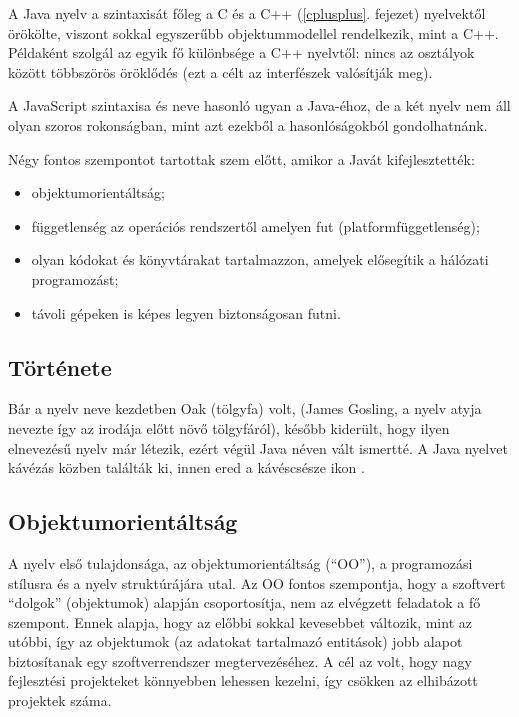 \documentclass[a4paper,12pt]{report}
\begin{document}
\vspace{2mm}
A Java nyelv a szintaxisát főleg a C és a C++ (\ref{cplusplus}. fejezet) nyelvektől örökölte, viszont sokkal egyszerűbb objektummodellel rendelkezik, mint a C++. Példaként szolgál az egyik fő különbsége a C++ nyelvtől: nincs az osztályok között többszörös öröklődés (ezt a célt az interfészek valósítják meg). 

\vspace{2mm}
A JavaScript szintaxisa és neve hasonló ugyan a Java-éhoz, de a két nyelv nem áll olyan szoros rokonságban, mint azt ezekből a hasonlóságokból gondolhatnánk.

\vspace{2mm}
Négy fontos szempontot tartottak szem előtt, amikor a Javát kifejlesztették:
\begin{itemize}
\item objektumorientáltság;
\item függetlenség az operációs rendszertől amelyen fut (platformfüggetlenség);
\item olyan kódokat és könyvtárakat tartalmazzon, amelyek elősegítik a hálózati programozást;
\item távoli gépeken is képes legyen biztonságosan futni.
\end{itemize}

\subsection{Története}
\label{javahistory}
\vspace{2mm}
Bár a nyelv neve kezdetben Oak (tölgyfa) volt, (James Gosling, a nyelv atyja nevezte így az irodája előtt növő tölgyfáról), később kiderült, hogy ilyen elnevezésű nyelv már létezik, ezért végül Java néven vált ismertté. A Java nyelvet kávézás közben találták ki, innen ered a kávéscsésze ikon \cite{javaname}.

\subsection{Objektumorientáltság}
\label{oo}

A nyelv első tulajdonsága, az objektumorientáltság (``OO''), a programozási stílusra és a nyelv struktúrájára utal. Az OO fontos szempontja, hogy a szoftvert ``dolgok'' (objektumok) alapján csoportosítja, nem az elvégzett feladatok a fő szempont. Ennek alapja, hogy az előbbi sokkal kevesebbet változik, mint az utóbbi, így az objektumok (az adatokat tartalmazó entitások) jobb alapot biztosítanak egy szoftverrendszer megtervezéséhez. A cél az volt, hogy nagy fejlesztési projekteket könnyebben lehessen kezelni, így csökken az elhibázott projektek száma.
\end{document}
